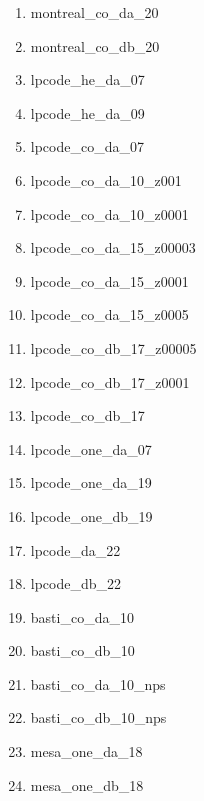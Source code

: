 \documentclass[fleqn,usenatbib]{rasti}
\begin{document}
\begin{enumerate}
    \item montreal\_co\_da\_20~\citep{2020ApJ...901...93B}
    \item montreal\_co\_db\_20~\citep{2020ApJ...901...93B}
    \item lpcode\_he\_da\_07~\citep{2007MNRAS.382..779P}
    \item lpcode\_he\_da\_09~\citep{2009ApJ...704.1605A}
    \item lpcode\_co\_da\_07~\citep{2007MNRAS.382..779P}
    \item lpcode\_co\_da\_10\_z001~\citep{2010ApJ...717..183R}
    \item lpcode\_co\_da\_10\_z0001~\citep{2010ApJ...717..183R}
    \item lpcode\_co\_da\_15\_z00003~\citep{2015A&A...576A...9A}
    \item lpcode\_co\_da\_15\_z0001~\citep[]{2015A&A...576A...9A}
    \item lpcode\_co\_da\_15\_z0005~\citep[]{2015A&A...576A...9A}
    \item lpcode\_co\_db\_17\_z00005~\citep[]{2017A&A...597A..67A}
    \item lpcode\_co\_db\_17\_z0001~\citep[]{2017A&A...597A..67A}
    \item lpcode\_co\_db\_17~\citep{2017ApJ...839...11C}
    \item lpcode\_one\_da\_07~\citep{2007A&A...465..249A}
    \item lpcode\_one\_da\_19~\citep{2019A&A...625A..87C}
    \item lpcode\_one\_db\_19~\citep{2019A&A...625A..87C}
    \item lpcode\_da\_22~\citep{2013A&A...557A..19A, 2016ApJ...823..158C, 2019A&A...625A..87C}
    \item lpcode\_db\_22~\citep{2017ApJ...839...11C, 2019A&A...625A..87C}
    \item basti\_co\_da\_10~\citep{2010ApJ...716.1241S}
    \item basti\_co\_db\_10~\citep{2010ApJ...716.1241S}
    \item basti\_co\_da\_10\_nps~\citep{2010ApJ...716.1241S}
    \item basti\_co\_db\_10\_nps~\citep{2010ApJ...716.1241S}
    \item mesa\_one\_da\_18~\citep{2018MNRAS.480.1547L}
    \item mesa\_one\_db\_18~\citep{2018MNRAS.480.1547L}
\end{enumerate}
\end{document}
